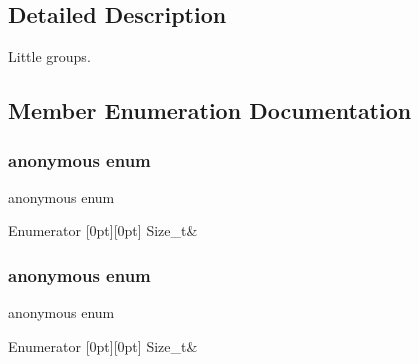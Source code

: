 \subsection{Detailed Description}
Little groups. 

\subsection{Member Enumeration Documentation}
\mbox{\label{structHadron_1_1D4Group_aebe422f0af477b78dbc12ed155d4f079}} 
\subsubsection{\texorpdfstring{anonymous enum}{anonymous enum}}
{\footnotesize\ttfamily anonymous enum}

\begin{DoxyEnumFields}{Enumerator}
[0pt][0pt]{}\mbox{\label{structHadron_1_1D4Group_aebe422f0af477b78dbc12ed155d4f079ae076685e366303af9dfb0c9b88184abd}} 
Size\+\_\+t&\\
\hline

\end{DoxyEnumFields}
\mbox{\label{structHadron_1_1D4Group_af92825190820aa8ab40711adfb31f20a}} 
\subsubsection{\texorpdfstring{anonymous enum}{anonymous enum}}
{\footnotesize\ttfamily anonymous enum}

\begin{DoxyEnumFields}{Enumerator}
[0pt][0pt]{}\mbox{\label{structHadron_1_1D4Group_aebe422f0af477b78dbc12ed155d4f079ae076685e366303af9dfb0c9b88184abd}} 
Size\+\_\+t&\\
\hline

\end{DoxyEnumFields}



